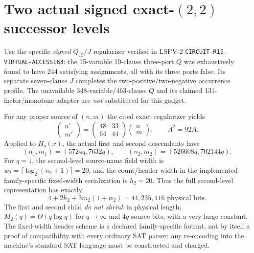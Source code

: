 \documentclass[11pt]{article}
\begin{document}
\section{Two actual signed exact-$(2,2)$ successor levels}
Use the specific \emph{signed} $Q_{15}/J$ regularizer verified in LSPV-2 \texttt{CIRCUIT-R15-VIRTUAL-ACCESS163}: the 15-variable 19-clause three-port $Q$ was exhaustively found to have 244 satisfying assignments, all with its three ports false. Its separate seven-clause $J$ completes the two-positive/two-negative occurrence profile. The unavailable 348-variable/463-clause $Q$ and its claimed 131-factor/monotone adapter are \emph{not} substituted for this gadget.

For any proper source of $(n,m)$ the cited exact regularizer yields
\[
\begin{pmatrix}n'\\m'\end{pmatrix}=\begin{pmatrix}48&33\\64&44\end{pmatrix}
\begin{pmatrix}n\\m\end{pmatrix},\qquad
A^2=92A.
\]
Applied to $H_q(x)$, the actual first and second descendants have
\[
(n_1,m_1)=(5724q,7632q),\qquad
\boxed{(n_2,m_2)=(526608q,702144q)}.
\]
For $q=1$, the second-level source-name field width is $w_2=\lceil\log_2(n_2+1)\rceil=20$, and the count/header width in the implemented family-specific fixed-width serialization is $h_2=20$. Thus the full second-level representation has exactly
\[
4+2h_2+3m_2(1+w_2)=\boxed{44,235,116\text{ physical bits}}.
\]
The first and second child \emph{do not shrink} in physical length; $M_2(q)=\Theta(q\log q)$ for $q\to\infty$ and $4q$ source bits, with a very large constant. The fixed-width header scheme is a declared family-specific format, not by itself a proof of compatibility with every ordinary SAT parser; any re-encoding into the machine's standard SAT language must be constructed and charged.
\end{document}
